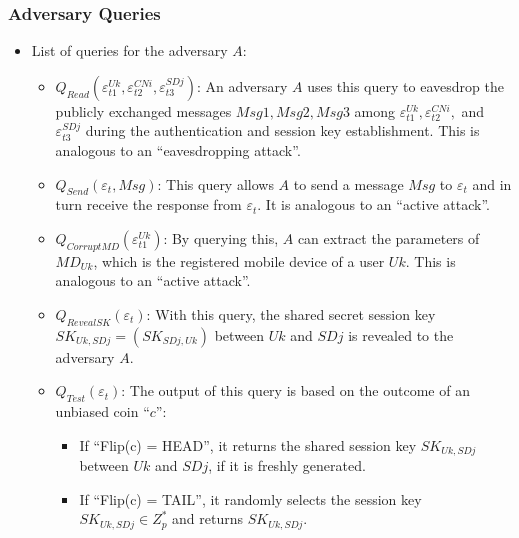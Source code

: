 \documentclass[9pt,handout]{beamer}
\begin{document}
\begin{frame}
    \frametitle{Adversary Queries}
    \begin{itemize}
        \item List of queries for the adversary \( A \):
            \begin{itemize}
                \item \textbf{\(Q_{Read}(\varepsilon_{t1}^{Uk}, \varepsilon_{t2}^{CNi}, \varepsilon_{t3}^{SDj})\)}: 
                An adversary \( A \) uses this query to eavesdrop the publicly exchanged messages \( Msg1, Msg2, Msg3 \) among \( \varepsilon_{t1}^{Uk}, \varepsilon_{t2}^{CNi}, \) and \( \varepsilon_{t3}^{SDj} \) during the authentication and session key establishment. This is analogous to an “eavesdropping attack”.
                \item \textbf{\(Q_{Send}(\varepsilon_{t}, Msg)\)}: 
                This query allows \( A \) to send a message \( Msg \) to \( \varepsilon_{t} \) and in turn receive the response from \( \varepsilon_{t} \). It is analogous to an “active attack”.
                \item \textbf{\(Q_{CorruptMD}(\varepsilon_{t1}^{Uk})\)}: 
                By querying this, \( A \) can extract the parameters of \( MD_{Uk} \), which is the registered mobile device of a user \( Uk \). This is analogous to an “active attack”.
                \item \textbf{\(Q_{RevealSK}(\varepsilon_{t})\)}: 
                With this query, the shared secret session key \( SK_{Uk,SDj} = (SK_{SDj,Uk}) \) between \( Uk \) and \( SDj \) is revealed to the adversary \( A \).
                \item \textbf{\(Q_{Test}(\varepsilon_{t})\)}: 
                The output of this query is based on the outcome of an unbiased coin “\( c \)”:
                \begin{itemize}
                    \item If “Flip(c) = HEAD”, it returns the shared session key \( SK_{Uk,SDj} \) between \( Uk \) and \( SDj \), if it is freshly generated.
                    \item If “Flip(c) = TAIL”, it randomly selects the session key \( SK_{Uk,SDj} \in Z^*_p \) and returns \( SK_{Uk,SDj} \).
                \end{itemize}
            \end{itemize}
    \end{itemize}
\end{frame}
\end{document}

